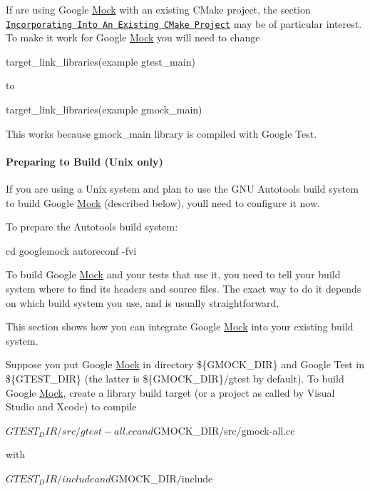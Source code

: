If are using Google \hyperlink{classMock}{Mock} with an existing C\+Make project, the section \href{../googletest/README.md#incorporating-into-an-existing-cmake-project}{\tt Incorporating Into An Existing C\+Make Project} may be of particular interest. To make it work for Google \hyperlink{classMock}{Mock} you will need to change \begin{DoxyVerb}target_link_libraries(example gtest_main)
\end{DoxyVerb}


to \begin{DoxyVerb}target_link_libraries(example gmock_main)
\end{DoxyVerb}


This works because {\ttfamily gmock\+\_\+main} library is compiled with Google Test.

\paragraph*{Preparing to Build (Unix only)}

If you are using a Unix system and plan to use the G\+NU Autotools build system to build Google \hyperlink{classMock}{Mock} (described below), you\textquotesingle{}ll need to configure it now.

To prepare the Autotools build system\+: \begin{DoxyVerb}cd googlemock
autoreconf -fvi
\end{DoxyVerb}


To build Google \hyperlink{classMock}{Mock} and your tests that use it, you need to tell your build system where to find its headers and source files. The exact way to do it depends on which build system you use, and is usually straightforward.

This section shows how you can integrate Google \hyperlink{classMock}{Mock} into your existing build system.

Suppose you put Google \hyperlink{classMock}{Mock} in directory {\ttfamily \$\{G\+M\+O\+C\+K\+\_\+\+D\+IR\}} and Google Test in {\ttfamily \$\{G\+T\+E\+S\+T\+\_\+\+D\+IR\}} (the latter is {\ttfamily \$\{G\+M\+O\+C\+K\+\_\+\+D\+IR\}/gtest} by default). To build Google \hyperlink{classMock}{Mock}, create a library build target (or a project as called by Visual Studio and Xcode) to compile \begin{DoxyVerb}${GTEST_DIR}/src/gtest-all.cc and ${GMOCK_DIR}/src/gmock-all.cc
\end{DoxyVerb}


with \begin{DoxyVerb}${GTEST_DIR}/include and ${GMOCK_DIR}/include
\end{DoxyVerb}


